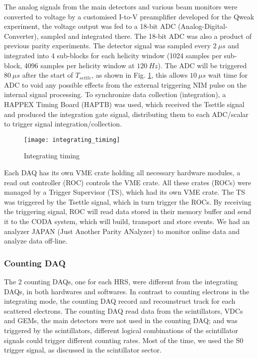 The analog signals from the main detectors and various beam monitors were converted 
to voltage by a customised I-to-V 
preamplifier developed for the Qweak experiment, the voltage output was fed
to a 18-bit ADC (Analog-Digital-Converter), sampled and integrated there. The
18-bit ADC was also a product of previous parity experiments. The detector signal was
sampled every $2\ \mu s$ and integrated into 4 sub-blocks for each helicity window
(1024 samples per sub-block, 4096 samples per helicity window at $120\ Hz$).
The ADC will be triggered $80\ \mu s$ after the start of $T_{settle}$, as shown
in Fig. \ref{fig:integrating_timing}, this allows $10\ \mu s$ wait time for 
ADC to void any possible effects from the external triggering NIM pulse on the 
internal signal processing. To synchronize data collection (integration), 
a HAPPEX Timing Board (HAPTB) was used, which received the Tsettle signal and
produced the integration gate signal, distributing them to each ADC/scalar to trigger
signal integration/collection.

\begin{figure}
    \centering
    \texttt{[image: integrating\_timing]}
    \caption{Integrating timing}
    \label{fig:integrating_timing}
\end{figure}

Each DAQ has its own VME crate holding all necessary hardware modules, a read 
out controller (ROC) controls the VME crate. All these crates (ROCs) were
managed by a Trigger Supervisor (TS), which had its own VME crate. The TS was
triggered by the Tsettle signal, which in turn trigger the ROCs.
By receiving the triggering signal, ROC will read data stored in their memory 
buffer and send it to the CODA system, 
which will build, transport and store events. We had an analyzer JAPAN (Just
Another Parity ANalyzer) to monitor online data and analyze data off-line.


\subsubsection{Counting DAQ}
The 2 counting DAQs, one for each HRS, were different from the integrating DAQs,
in both hardwares and softwares. In contrast to counting electrons in the integrating
mode, the counting DAQ record and recounstruct track for each scattered electrons.
The counting DAQ read data from the scintillators,
VDCs and GEMs, the main detectors were not used in the counting DAQ; and was
triggered by the scintillators, different logical combinations of the scintillator
signals could trigger different counting rates. Most of the time, we used the S0
trigger signal, as discussed in the scintillator sector.

